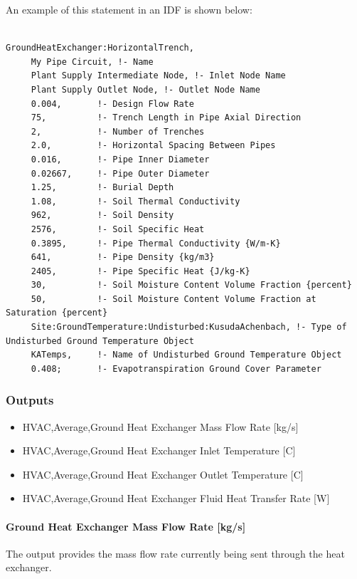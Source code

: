 An example of this statement in an IDF is shown below:

\begin{lstlisting}

GroundHeatExchanger:HorizontalTrench,
     My Pipe Circuit, !- Name
     Plant Supply Intermediate Node, !- Inlet Node Name
     Plant Supply Outlet Node, !- Outlet Node Name
     0.004,       !- Design Flow Rate
     75,          !- Trench Length in Pipe Axial Direction
     2,           !- Number of Trenches
     2.0,         !- Horizontal Spacing Between Pipes
     0.016,       !- Pipe Inner Diameter
     0.02667,     !- Pipe Outer Diameter
     1.25,        !- Burial Depth
     1.08,        !- Soil Thermal Conductivity
     962,         !- Soil Density
     2576,        !- Soil Specific Heat
     0.3895,      !- Pipe Thermal Conductivity {W/m-K}
     641,         !- Pipe Density {kg/m3}
     2405,        !- Pipe Specific Heat {J/kg-K}
     30,          !- Soil Moisture Content Volume Fraction {percent}
     50,          !- Soil Moisture Content Volume Fraction at Saturation {percent}
     Site:GroundTemperature:Undisturbed:KusudaAchenbach, !- Type of Undisturbed Ground Temperature Object
     KATemps,     !- Name of Undisturbed Ground Temperature Object
     0.408;       !- Evapotranspiration Ground Cover Parameter
\end{lstlisting}

\subsubsection{Outputs}\label{outputs-14-000}

\begin{itemize}
\item
  HVAC,Average,Ground Heat Exchanger Mass Flow Rate {[}kg/s{]}
\item
  HVAC,Average,Ground Heat Exchanger Inlet Temperature {[}C{]}
\item
  HVAC,Average,Ground Heat Exchanger Outlet Temperature {[}C{]}
\item
  HVAC,Average,Ground Heat Exchanger Fluid Heat Transfer Rate {[}W{]}
\end{itemize}

\paragraph{Ground Heat Exchanger Mass Flow Rate {[}kg/s{]}}\label{ground-heat-exchanger-mass-flow-rate-kgs-3}

The output provides the mass flow rate currently being sent through the heat exchanger.

